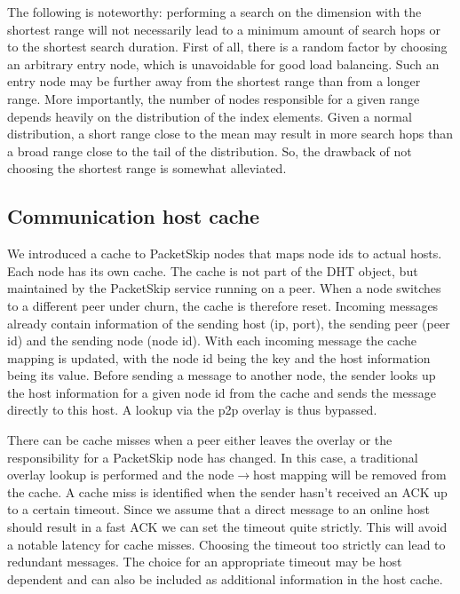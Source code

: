 The following is noteworthy: performing a search on the dimension with the shortest range will not necessarily lead to a minimum amount of search hops or to the shortest search duration. First of all, there is a random factor by choosing an arbitrary entry node, which is unavoidable for good load balancing. Such an entry node may be further away from the shortest range than from a longer range. More importantly, the number of nodes responsible for a given range depends heavily on the distribution of the index elements. Given a normal distribution, a short range close to the mean may result in more search hops than a broad range close to the tail of the distribution. So, the drawback of not choosing the shortest range is somewhat alleviated.

\subsection{Communication host cache}
\label{subsec:cache}

We introduced a cache to PacketSkip nodes that maps node ids to actual hosts. Each node has its own cache. The cache is not part of the DHT object, but maintained by the PacketSkip service running on a peer. When a node switches to a different peer under churn, the cache is therefore reset. Incoming messages already contain information of the sending host (ip, port), the sending peer (peer id) and the sending node (node id). With each incoming message the cache mapping is updated, with the node id being the key and the host information being its value. Before sending a message to another node, the sender looks up the host information for a given node id from the cache and sends the message directly to this host. A lookup via the p2p overlay is thus bypassed. 

There can be cache misses when a peer either leaves the overlay or the responsibility for a PacketSkip node has changed. In this case, a traditional overlay lookup is performed and the node$\rightarrow$host mapping will be removed from the cache. A cache miss is identified when the sender hasn't received an ACK up to a certain timeout. Since we assume that a direct message to an online host should result in a fast ACK we can set the timeout quite strictly. This will avoid a notable latency for cache misses. Choosing the timeout too strictly can lead to redundant messages. The choice for an appropriate timeout may be host dependent and can also be included as additional information in the host cache.

